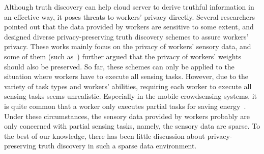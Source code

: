 \documentclass[conference]{IEEEtran}
\begin{document}
Although truth discovery can help cloud server to derive truthful information in an effective way, it poses threats to workers' privacy directly.
Several researchers~\cite{miao_cloud-enabled_2015,xu_efficient_2019,miao_lightweight_2017,zhang_reliable_2019,xue_inpptd_2020,tang_achieving_2021} pointed out that the data provided by workers are sensitive to some extent, and designed diverse privacy-preserving truth discovery schemes to assure workers' privacy.
These works mainly focus on the privacy of workers' sensory data, and some of them (such as~\cite{zhang_reliable_2019,xue_inpptd_2020,tang_achieving_2021}) further argued that the privacy of workers' weights should also be preserved.
So far, these schemes can only be applied to the situation where workers have to execute all sensing tasks.
However, due to the variety of task types and workers' abilities, requiring each worker to execute all sensing tasks seems unrealistic.
Especially in the mobile crowdsensing systems, it is quite common that a worker only executes partial tasks for saving energy~\cite{wang_sparse_2016,wang_energy_2018}.
Under these circumstances, the sensory data provided by workers probably are only concerned with partial sensing tasks, namely, the sensory data are sparse.
To the best of our knowledge, there has been little discussion about privacy-preserving truth discovery in such a sparse data environment.
\end{document}
